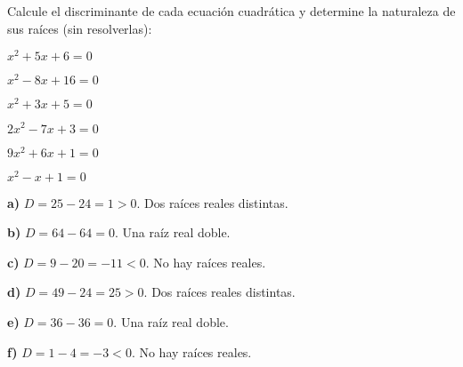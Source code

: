 \begin{exercise}
\problem Calcule el discriminante de cada ecuación cuadrática y determine la naturaleza de sus raíces (sin resolverlas):

\begin{exerciselist}
    \item $x^2 + 5x + 6 = 0$
    \item $x^2 - 8x + 16 = 0$
    \item $x^2 + 3x + 5 = 0$
    \item $2x^2 - 7x + 3 = 0$
    \item $9x^2 + 6x + 1 = 0$
    \item $x^2 - x + 1 = 0$
\end{exerciselist}

\begin{solucion}
\textbf{a)} $D = 25 - 24 = 1 > 0$. Dos raíces reales distintas.

\textbf{b)} $D = 64 - 64 = 0$. Una raíz real doble.

\textbf{c)} $D = 9 - 20 = -11 < 0$. No hay raíces reales.

\textbf{d)} $D = 49 - 24 = 25 > 0$. Dos raíces reales distintas.

\textbf{e)} $D = 36 - 36 = 0$. Una raíz real doble.

\textbf{f)} $D = 1 - 4 = -3 < 0$. No hay raíces reales.
\end{solucion}
\end{exercise}

